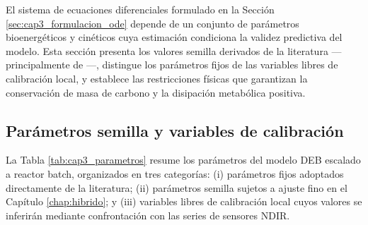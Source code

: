 

El sistema de ecuaciones diferenciales formulado en la Sección \ref{sec:cap3_formulacion_ode} depende de un conjunto de parámetros bioenergéticos y cinéticos cuya estimación condiciona la validez predictiva del modelo. Esta sección presenta los valores semilla derivados de la literatura —principalmente de \parencite{eriksenDynamicModellingFeed2022}—, distingue los parámetros fijos de las variables libres de calibración local, y establece las restricciones físicas que garantizan la conservación de masa de carbono y la disipación metabólica positiva.

\subsection{Parámetros semilla y variables de calibración}
\label{subsec:cap3_semilla}

La Tabla \ref{tab:cap3_parametros} resume los parámetros del modelo DEB escalado a reactor batch, organizados en tres categorías: (i) parámetros fijos adoptados directamente de la literatura; (ii) parámetros semilla sujetos a ajuste fino en el Capítulo \ref{chap:hibrido}; y (iii) variables libres de calibración local cuyos valores se inferirán mediante confrontación con las series de sensores NDIR.


